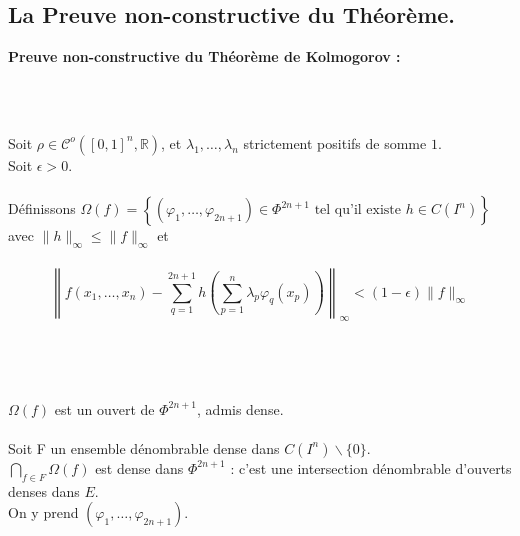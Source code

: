 \documentclass[8pt,a9paper]{beamer} \usepackage[utf8]{inputenc} \usepackage[francais]{babel} \usepackage[T1]{fontenc}
\newcommand{\titp}[1]{\begin{center}\large{\textbf{#1}}\end{center}}
\begin{document}
\subsection{La Preuve non-constructive du Théorème.}
\begin{frame}
	\titp{Preuve non-constructive du Théorème de Kolmogorov :}
	\textbf{\\}
	\textbf{\\}

	Soit $\rho \in \mathcal{C}^o([0,1]^n, \mathbb{R})$, et $\lambda_1,…,\lambda_n$ strictement positifs de somme $1$.\\
	Soit $\epsilon>0$. \\\textbf{\\}
	Définissons $\Omega(f)=\left\lbrace (\varphi_1,…, \varphi_{2n+1}) \in \Phi^{2n+1} \text{ tel qu'il existe } h \in C(I^n)\right\rbrace$ avec $\|h\|_\infty \leq \|f\|_\infty$ et\\	\textbf{\\}
	\begin{equation}
	\displaystyle \left\| f(x_1,…, x_n) - \sum_{q=1}^{2n+1} h \left(\sum_{p=1}^n \lambda_p \varphi_q (x_p) \right) \right\|_\infty < (1-\epsilon)\|f\|_\infty \label{Th}
	\end{equation}
	\textbf{\\}	\textbf{\\}
	\textbf{\\}	\textbf{\\}
	$\Omega(f)$ est un ouvert de $\Phi ^{2n+1}$, admis dense. \\
	\textbf{\\}
	Soit F un ensemble dénombrable dense dans $C(I^n)\backslash\{0\}$.\\
	$\bigcap_{f \in F} \Omega(f)$ est dense dans $\Phi^{2n+1}$ : c'est une intersection dénombrable d'ouverts denses dans $E$.\\
	On y prend $(\varphi_1,…,\varphi_{2n+1})$.\\
	\textbf{\\}
\end{frame}
\end{document}
